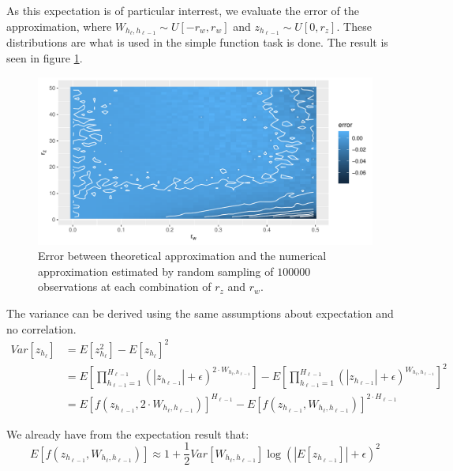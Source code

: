 As this expectation is of particular interrest, we evaluate the error of the approximation, where $W_{h_{\ell}, h_{\ell-1}} \sim U[-r_w,r_w]$ and $z_{h_{\ell-1}} \sim U[0, r_z]$. These distributions are what is used in the simple function task is done.  The result is seen in figure \ref{fig:nac-mul-expectation-estimate}.
\begin{figure}[h]
\centering
\includegraphics[width=\linewidth]{graphics/nac-mul-expectation-estimate.pdf}
\caption{Error between theoretical approximation and the numerical approximation estimated by random sampling of $100000$ observations at each combination of $r_z$ and $r_w$.}
\label{fig:nac-mul-expectation-estimate}
\end{figure}

The variance can be derived using the same assumptions about expectation and no correlation.
\begin{equation}
\begin{aligned}
Var[z_{h_\ell}] &= E[z_{h_\ell}^2] - E[z_{h_\ell}]^2 \\
&= E\left[\prod_{h_{\ell-1}=1}^{H_{\ell-1}} (|z_{h_{\ell-1}}| + \epsilon)^{2 \cdot W_{h_{\ell}, h_{\ell-1}}} \right]
- E\left[\prod_{h_{\ell-1}=1}^{H_{\ell-1}} (|z_{h_{\ell-1}}| + \epsilon)^{W_{h_{\ell}, h_{\ell-1}}}\right]^2 \\
&= E\left[f(z_{h_{\ell-1}}, 2 \cdot W_{h_{\ell}, h_{\ell-1}}) \right]^{H_{\ell-1}}
- E\left[f(z_{h_{\ell-1}}, W_{h_{\ell}, h_{\ell-1}})\right]^{2\cdot H_{\ell-1}}
\end{aligned}
\end{equation}

We already have from the expectation result that:
\begin{equation}
E\left[f(z_{h_{\ell-1}}, W_{h_{\ell}, h_{\ell-1}})\right] \approx 1 + \frac{1}{2} Var[W_{h_{\ell}, h_{\ell-1}}] \log(|E[z_{h_{\ell-1}}]| + \epsilon)^2
\end{equation}

